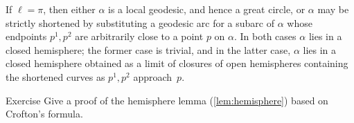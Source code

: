 If $\ell=\pi$, then either $\alpha$ is a local geodesic, and hence a great circle, 
or $\alpha$ may be strictly shortened by substituting a geodesic arc for a subarc of $\alpha$ 
whose endpoints $p^1,p^2$ are arbitrarily close to a point $p$ on $\alpha$.
In both cases $\alpha$ lies in a closed hemisphere;
the former case is trivial, and in the latter case, $\alpha$ lies in a closed hemisphere obtained as a limit of closures of open hemispheres containing the shortened curves as $p^1,p^2$ approach~$p$.
\qeds


\begin{thm}{Exercise}\label{exr-crofton}
Give a proof of the hemisphere lemma (\ref{lem:hemisphere}) based on Crofton's formula.
\end{thm}

